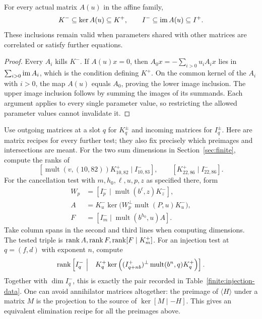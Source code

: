 \begin{lemma}\label{alg:enclosures-valid}
For every actual matrix $A(u)$ in the affine family,
\[
 K^-\subseteq\ker A(u)\subseteq K^+,
 \qquad I^-\subseteq\operatorname{im} A(u)\subseteq I^+.
\]
These inclusions remain valid when parameters shared with other
matrices are correlated or satisfy further equations.
\end{lemma}

\begin{proof}
Every $A_i$ kills $K^-$.  If $A(u)x=0$, then
$A_0x=-\sum_{i>0}u_iA_ix$ lies in $\sum_{i>0}\operatorname{im} A_i$, which is
the condition defining $K^+$.  On the common kernel of the $A_i$ with
$i>0$, the map $A(u)$ equals $A_0$, proving the lower image inclusion.
The upper image inclusion follows by summing the images of its
summands.  Each argument applies to every single parameter value, so
restricting the allowed parameter values cannot invalidate it.
\end{proof}

Use outgoing matrices at a slot $q$ for $K_q^\pm$ and incoming matrices
for $I_q^\pm$.  Here are matrix recipes for every further test; they
also fix precisely which preimages and intersections are meant.
For the two sum dimensions in Section~\ref{sec:finite}, compute the
ranks of
\[
 [\operatorname{mult}(v,(10,82))K^+_{10,82}\mid I^-_{10,83}],
 \qquad[K^+_{22,86}\mid I^-_{22,86}].
\]
For the cancellation test with $m,h_0,\ell,u,p,z$ as specified there, form
\begin{align}
 W_p&=[I^-_p\mid\operatorname{mult}(b^\ell,z)K^-_z],\label{alg:allowed-space}\\
 A&=K^-_u\ker\bigl(W_p^\perp
                         \operatorname{mult}(P,u)K^-_u\bigr),
                         \label{alg:cancellation-preimage}\\
 F&=[I^-_m\mid\operatorname{mult}(b^{h_0},u)A].
                         \label{alg:cancellation-span}
\end{align}
Take column spans in the second and third lines when computing
dimensions.  The tested triple is
$\operatorname{rank} A,\operatorname{rank} F,\operatorname{rank}[F\mid K^+_m]$.
For an injection test at $q=(f,d)$ with exponent $n$, compute
\begin{equation}\label{alg:injection-test}
 \operatorname{rank}\left[I^-_q\ \middle|\quad
 K^+_q\ker\left((I^+_{q+nb})^\perp
                    \operatorname{mult}(b^n,q)K^+_q\right)\right].
\end{equation}
Together with $\dim I^-_q$, this is exactly the pair recorded in
Table~\ref{finite:injection-data}.  One can avoid annihilator matrices
altogether: the preimage of $\langle H\rangle$ under a matrix $M$ is
the projection to the source of $\ker[M\mid-H]$.  This gives an
equivalent elimination recipe for all the preimages above.


